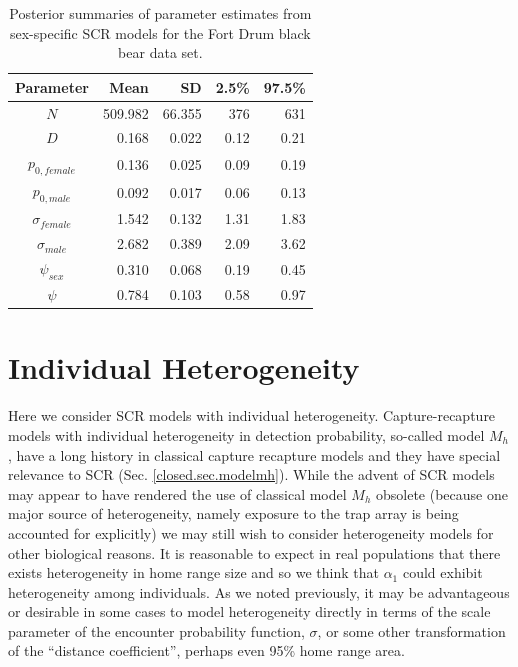 \begin{table}[ht]
\centering
\caption{Posterior summaries of parameter estimates from sex-specific SCR models for the Fort Drum black bear data set.}
\begin{tabular}{crrrr}
\hline \hline
Parameter & Mean & SD & 2.5\% & 97.5\% \\
\hline
$N$   &   509.982 & 66.355 & 376 & 631 \\
$D$  &     0.168 & 0.022 & 0.12 & 0.21  \\
$p_{0, female}$ & 0.136 & 0.025 & 0.09 & 0.19 \\
$p_{0, male}$ & 0.092 & 0.017 & 0.06 & 0.13 \\
$\sigma_{female}$ & 1.542 &  0.132 & 1.31 & 1.83 \\
$\sigma_{male}$ & 2.682 & 0.389 & 2.09 & 3.62 \\ 
$\psi_{sex}$ &  0.310 & 0.068 & 0.19 & 0.45 \\
$\psi$  & 0.784 & 0.103 & 0.58 & 0.97 \\  \hline
\end{tabular}
\label{covariates.tab.SCRsex}
\end{table}



\section{Individual Heterogeneity}

Here we consider SCR models with individual heterogeneity.
Capture-recapture models with individual heterogeneity in detection
probability, so-called model $M_{h}$, have a long history in classical
capture recapture models and they have special relevance to SCR
(Sec. \ref{closed.sec.modelmh}).  While the advent of SCR models may
appear to have rendered the use of classical model $M_h$ obsolete
(because one major source of heterogeneity, namely exposure to the
trap array is being accounted for explicitly) we may still wish to
consider heterogeneity models for other biological reasons.  It is
reasonable to expect in real populations that there exists
heterogeneity in home range size and so we think that $\alpha_{1}$
could exhibit heterogeneity among individuals.  As we noted
previously, it may be advantageous or desirable in some cases to model
heterogeneity directly in terms of the scale parameter of the
encounter probability function, $\sigma$, or some other transformation
of the ``distance coefficient'', perhaps even 95\% home range area.

